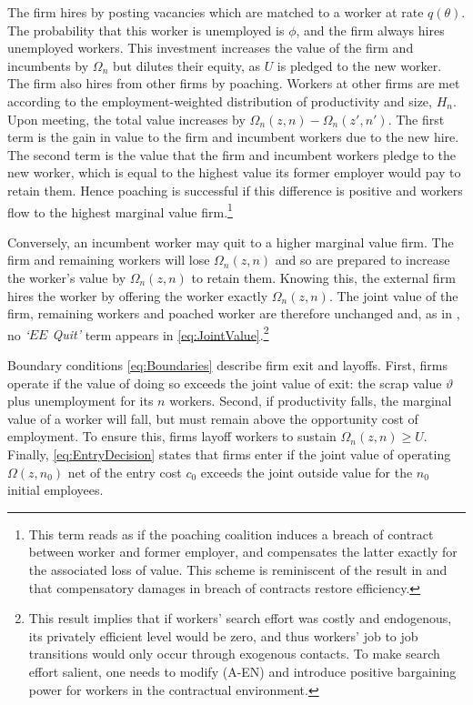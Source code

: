 The firm hires by posting vacancies which are matched to a worker at rate $q(\theta)$.
The probability that this worker is unemployed is $\phi$, and the firm always hires unemployed workers.
This investment increases the value of the firm and incumbents by $\Omega_n$ but dilutes their equity, as $U$ is pledged to the new worker.
The firm also hires from other firms by poaching.
Workers at other firms are met according to the employment-weighted distribution of productivity and size, $H_n$.
Upon meeting, the total value increases by $\Omega_n(z,n)-\Omega_n(z',n')$.
The first term is the gain in value to the firm and incumbent workers due to the new hire.
The second term is the value that the firm and incumbent workers pledge to the new worker, which is equal to the highest value its former employer would pay to retain them.
Hence poaching is successful if this difference is positive and workers flow to the highest marginal value firm.\footnote{
    This term reads as if the poaching coalition induces a breach of contract between worker and former employer, and compensates the latter exactly for the associated loss of value.
    This scheme is reminiscent of the result in \citet{diamond1979equilibrium} and \citet{kiyotaki2007model} that compensatory damages in breach of contracts restore efficiency.}

Conversely, an incumbent worker may quit to a higher marginal value firm.
The firm and remaining workers will lose $\Omega_n(z,n)$ and so are prepared to increase the worker's value by $\Omega_n(z,n)$ to retain them.
Knowing this, the external firm hires the worker by offering the worker exactly $\Omega_n(z,n)$.
The joint value of the firm, remaining workers and poached worker are therefore unchanged and, as in \citet{postelvinayrobin2002}, no \emph{`$EE$ Quit'} term appears in \eqref{eq:JointValue}.\footnote{This result implies that if workers' search effort was costly and endogenous, its privately efficient level would be zero, and thus workers' job to job transitions would only occur through exogenous contacts. To make search effort salient, one needs to modify (A-EN) and introduce positive bargaining power for workers in the contractual environment.}

Boundary conditions \eqref{eq:Boundaries} describe firm exit and layoffs.
First, firms operate if the value of doing so exceeds the joint value of exit: the scrap value $\vartheta$ plus unemployment for its $n$ workers.
Second, if productivity falls, the marginal value of a worker will fall, but must remain above the opportunity cost of employment.
To ensure this, firms layoff workers to sustain $\Omega_n(z,n)\geq U$.
Finally, \eqref{eq:EntryDecision} states that firms enter if the joint value of operating $\Omega(z,n_0)$ net of the entry cost $c_0$ exceeds the joint outside value for the $n_0$ initial employees. \medskip

